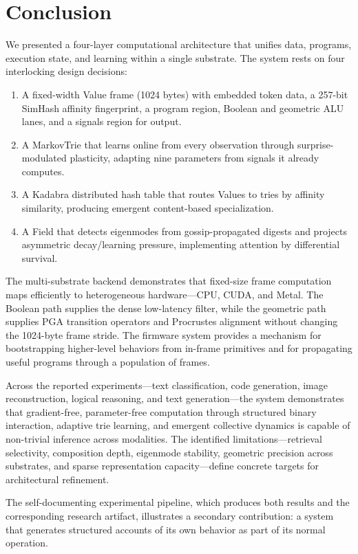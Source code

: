 \section{Conclusion}

We presented a four-layer computational architecture that unifies data,
programs, execution state, and learning within a single substrate.  The
system rests on four interlocking design decisions:

\begin{enumerate}[nosep]
  \item A fixed-width Value frame (1024 bytes) with embedded token data,
        a 257-bit SimHash affinity fingerprint, a program region,
        Boolean and geometric ALU lanes, and a signals region for output.
  \item A MarkovTrie that learns online from every observation through
        surprise-modulated plasticity, adapting nine parameters from
        signals it already computes.
  \item A Kadabra distributed hash table that routes Values to tries by
        affinity similarity, producing emergent content-based
        specialization.
  \item A Field that detects eigenmodes from gossip-propagated digests
        and projects asymmetric decay/learning pressure, implementing
        attention by differential survival.
\end{enumerate}

The multi-substrate backend demonstrates that fixed-size frame
computation maps efficiently to heterogeneous hardware---CPU, CUDA, and
Metal.  The Boolean path supplies the dense low-latency filter, while
the geometric path supplies PGA transition operators and Procrustes
alignment without changing the 1024-byte frame stride.  The firmware
system provides a mechanism for bootstrapping higher-level behaviors
from in-frame primitives and for propagating useful programs through a
population of frames.

Across the reported experiments---text classification, code generation,
image reconstruction, logical reasoning, and text generation---the
system demonstrates that gradient-free, parameter-free computation
through structured binary interaction, adaptive trie learning, and
emergent collective dynamics is capable of non-trivial inference across
modalities.  The identified limitations---retrieval selectivity,
composition depth, eigenmode stability, geometric precision across
substrates, and sparse representation capacity---define concrete
targets for architectural refinement.

The self-documenting experimental pipeline, which produces both results
and the corresponding research artifact, illustrates a secondary
contribution: a system that generates structured accounts of its own
behavior as part of its normal operation.
